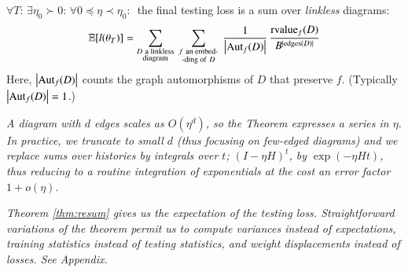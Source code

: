            \begin{thm} \label{thm:resum}
                $\forall T:\, \exists \eta_0 \succ 0:\,
                \forall 0\preceq \eta \prec \eta_0:\,$
                the final testing loss is
                a sum over \emph{linkless} diagrams: 
                \begin{equation*} \label{eq:resum}
                    \mathbb{E}[l(\theta_T)]=
                    \sum_{\substack{D~\text{a linkless} \\ \text{diagram}}}
                    ~
                    \sum_{\substack{f~\text{an embed-} \\ \text{-ding of}~D}}
                    ~
                    \frac{1}{\left|\text{\textnormal{Aut}}_f(D)\right|}
                    \,
                    \frac{{\text{\textnormal{rvalue}}_f}(D)}{B^{|\text{\textnormal{edges}}(D)|}}
                \end{equation*}
                Here, $\left|\text{\textnormal{Aut}}_f(D)\right|$ counts the graph automorphisms of $D$
                that preserve $f$. (Typically $\left|\text{\textnormal{Aut}}_f(D)\right|=1$.)%
            \end{thm}
            \begin{rmk} \label{rmk:integrate}
                \emph{
                A diagram with $d$ edges scales as
                $O(\eta^d)$, so the Theorem expresses a series in $\eta$.  In
                practice, we truncate to small $d$ (thus focusing on few-edged
                diagrams) and we replace sums over histories by integrals over
                $t$; $(I-\eta H)^t$, by $\exp(- \eta H t)$, thus reducing to a
                routine integration of exponentials at the cost an error factor
                $1 + o(\eta)$.}\mend
            \end{rmk}
            \begin{rmk}
                \emph{Theorem \ref{thm:resum} gives us the expectation of 
                the testing loss.  Straightforward variations of the theorem permit us
                to compute variances instead of expectations, training
                statistics instead of testing statistics, and weight
                displacements instead of losses.  See Appendix.}\mend
            \end{rmk}
